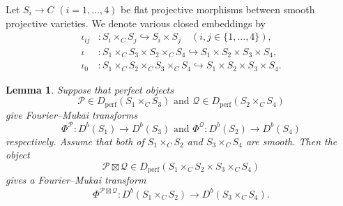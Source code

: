\documentclass[a4paper,11pt]{article}
\newtheorem{lem}[thm]{Lemma}
\theoremstyle{definition}\newtheorem{defn}[thm]{Definition}
\theoremstyle{remark}\newtheorem{remark}[thm]{Remark}
\numberwithin{equation}{section}
\newcommand{\mc}{\mathcal}
\newcommand{\perf}{\operatorname{perf}}
\begin{document}
Let $S_i \to C$ $(i=1,\ldots,4)$ be flat projective 
morphisms between smooth projective varieties. 
We denote various closed embeddings by 
%
\begin{align*}
\iota _{ij}& \colon S_i\times_C S_j \hookrightarrow S_i\times S_j
\quad (i,j\in \{1,\ldots,4 \}), \\
\iota &\colon S_1\times_C S_3\times S_2\times_C S_4
 \hookrightarrow S_1\times S_2\times S_3\times S_4,\\
\iota _0   & \colon S_1\times_C S_2\times_C S_3\times_C S_4\hookrightarrow 
S_1\times S_2\times S_3\times S_4.
\end{align*}
 

\begin{lem}\label{lem:product} 
Suppose that perfect objects 
$$
\mc P \in D_{\perf}(S_1\times_C S_3) 
\mbox{ and } \mc Q \in D_{\perf}(S_2\times_C S_4)
$$ 
give Fourier--Mukai transforms 
$$
\Phi ^{\mc P}\colon  D^b(S_1)\to D^b(S_3)
\mbox{ and }
\Phi ^{\mc Q}\colon  D^b(S_2)\to D^b(S_4)
$$
respectively. 
Assume that both of $S_1\times_C S_2$ and $S_3\times_C S_4$ are smooth.
Then the object 
$$
\mc P\boxtimes \mc Q\in D_{\perf}(S_1\times_CS_2\times S_3\times_CS_4)
$$ 
gives a Fourier--Mukai transform 
$$
\Phi ^{\mc P\boxtimes \mc Q}
\colon  D^b(S_1\times_C S_2)\to D^b(S_3\times_C S_4).
$$
\end{lem}
\end{document}
